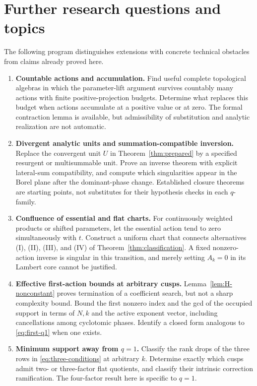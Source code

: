 \documentclass[11pt,a4paper]{article}
\numberwithin{equation}{section}
\theoremstyle{definition}\newtheorem{definition}[theorem]{Definition}
\theoremstyle{remark}\newtheorem{remark}[theorem]{Remark}
\begin{document}
\section{Further research questions and topics}
\label{sec:research}
The following program distinguishes extensions with concrete technical
obstacles from claims already proved here.
\begin{enumerate}[label=\textbf{R\arabic*.},leftmargin=14mm]
\item \textbf{Countable actions and accumulation.}
Find useful complete topological algebras in which the parameter-lift
argument survives countably many actions with finite positive-projection
budgets. Determine what replaces this budget when actions accumulate at
a positive value or at zero. The formal contraction lemma is available,
but admissibility of substitution and analytic realization are not
automatic.

\item \textbf{Divergent analytic units and summation-compatible inversion.}
Replace the convergent unit $U$ in Theorem~\ref{thm:prepared} by a
specified resurgent or multisummable unit. Prove an inverse theorem with
explicit lateral-sum compatibility, and compute which singularities
appear in the Borel plane after the dominant-phase change. Established
closure theorems are starting points, not substitutes for their
hypothesis checks in each $q$-family.

\item \textbf{Confluence of essential and flat charts.}
For continuously weighted products or shifted parameters, let the
essential action tend to zero simultaneously with $t$. Construct a
uniform chart that connects alternatives (I), (II), (III), and (IV) of
Theorem~\ref{thm:classification}. A fixed nonzero-action inverse is
singular in this transition, and merely setting $A_k=0$ in its Lambert
core cannot be justified.

\item \textbf{Effective first-action bounds at arbitrary cusps.}
Lemma~\ref{lem:H-nonconstant} proves termination of a coefficient search,
but not a sharp complexity bound. Bound the first nonzero index and the
gcd of the occupied support in terms of $N,k$ and the active exponent
vector, including cancellations among cyclotomic phases. Identify a
closed form analogous to \eqref{eq:first-q1} when one exists.

\item \textbf{Minimum support away from $q=1$.}
Classify the rank drops of the three rows in
\eqref{eq:three-conditions} at arbitrary $k$. Determine exactly which
cusps admit two- or three-factor flat quotients, and classify their
intrinsic correction ramification. The four-factor result here is
specific to $q=1$.


\end{enumerate}
\end{document}

